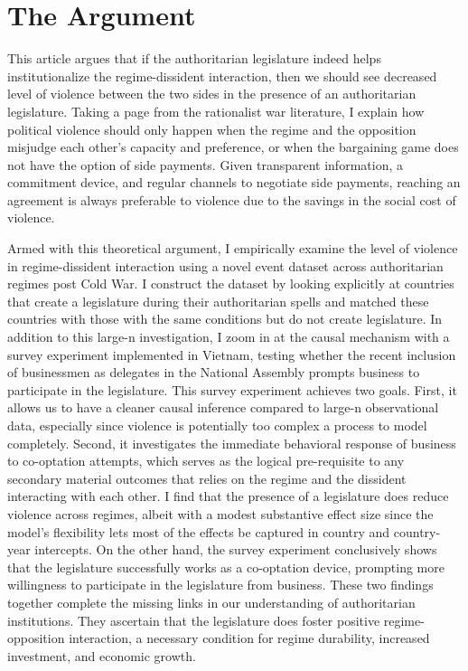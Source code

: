\section{The Argument}
\label{sec:argument}

This article argues that if the authoritarian legislature indeed helps institutionalize the regime-dissident interaction, then we should see decreased level of violence between the two sides in the presence of an authoritarian legislature. Taking a page from the rationalist war literature, I explain how political violence should only happen when the regime and the opposition misjudge each other's capacity and preference, or when the bargaining game does not have the option of side payments. Given transparent information, a commitment device, and regular channels to negotiate side payments, reaching an agreement is always preferable to violence due to the savings in the social cost of violence.

Armed with this theoretical argument, I empirically examine the level of violence in regime-dissident interaction using a novel event dataset across authoritarian regimes post Cold War. I construct the dataset by looking explicitly at countries that create a legislature during their authoritarian spells and matched these countries with those with the same conditions but do not create legislature. In addition to this large-n investigation, I zoom in at the causal mechanism with a survey experiment implemented in Vietnam, testing whether the recent inclusion of businessmen as delegates in the National Assembly prompts business to participate in the legislature. This survey experiment achieves two goals. First, it allows us to have a cleaner causal inference compared to large-n observational data, especially since violence is potentially too complex a process to model completely. Second, it investigates the immediate behavioral response of business to co-optation attempts, which serves as the logical pre-requisite to any secondary material outcomes that relies on the regime and the dissident interacting with each other. I find that the presence of a legislature does reduce violence across regimes, albeit with a modest substantive effect size since the model's flexibility lets most of the effects be captured in country and country-year intercepts. On the other hand, the survey experiment conclusively shows that the legislature successfully works as a co-optation device, prompting more willingness to participate in the legislature from business. These two findings together complete the missing links in our understanding of authoritarian institutions. They ascertain that the legislature does foster positive regime-opposition interaction, a necessary condition for regime durability, increased investment, and economic growth.